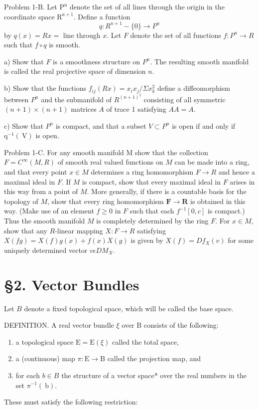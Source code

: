 \documentclass[10pt]{article}
\begin{document}
Problem 1-B. Let $\mathrm{P}^{\mathrm{n}}$ denote the set of all lines through the origin in the coordinate space $\mathrm{R}^{\mathrm{n}+1}$. Define a function
$$
q: R^{n+1}-\{0\} \rightarrow P^{n}
$$
by $q(x)=R x=$ line through $x$. Let $F$ denote the set of all functions $f: P^{n} \rightarrow R$ such that $f \circ q$ is smooth.

a) Show that $F$ is a smoothness structure on $P^{n}$. The resulting smooth manifold is called the real projective space of dimension $n$.

b) Show that the functions $f_{i j}(R x)=x_{i} x_{j} / \Sigma x_{k}^{2}$ define a diffeomorphism between $P^{n}$ and the submanifold of $R^{(n+1)^{2}}$ consisting of all symmetric $(n+1) \times(n+1)$ matrices $A$ of trace 1 satisfying $A A=A$.

c) Show that $P^{n}$ is compact, and that a subset $V \subset P^{n}$ is open if and only if $\mathrm{q}^{-1}(\mathrm{~V})$ is open.

Problem 1-C. For any smooth manifold M show that the collection $F=C^{\infty}(M, R)$ of smooth real valued functions on $M$ can be made into a ring, and that every point $x \in M$ determines a ring homomorphism $F \rightarrow R$ and hence a maximal ideal in $F$. If $M$ is compact, show that every maximal ideal in $F$ arises in this way from a point of $M$. More generally, if there is a countable basis for the topology of $M$, show that every ring homomorphism $\mathbf{F} \rightarrow \mathbf{R}$ is obtained in this way. (Make use of an element $f \geq 0$ in $F$ such that each $f^{-1}[0, c]$ is compact.) Thus the smooth manifold $M$ is completely determined by the ring $F$. For $x \in M$, show that any $R$-linear mapping $X: F \rightarrow R$ satisfying $X(f g)=X(f) g(x)+f(x) X(g)$ is given by $X(f)=D f_{X}(v)$ for some uniquely determined vector $v \epsilon D M_{X}$.

\section{§2. Vector Bundles}
Let $B$ denote a fixed topological space, which will be called the base space.

DEFINITION. A real vector bundle $\xi$ over B consists of the following:

\begin{enumerate}
  \item a topological space $\mathrm{E}=\mathrm{E}(\xi)$ called the total space,
  \item a (continuous) map $\pi: \mathrm{E} \rightarrow \mathrm{B}$ called the projection map, and
  \item for each $b \in B$ the structure of a vector space* over the real numbers in the set $\pi^{-1}(\mathrm{~b})$.
\end{enumerate}
These must satisfy the following restriction:
\end{document}
